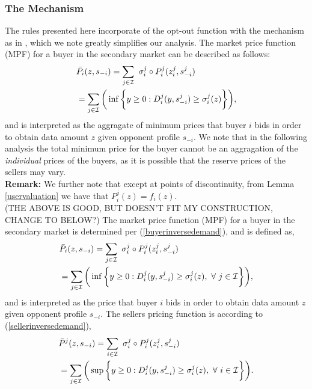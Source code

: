 \subsubsection{The Mechanism}\label{datamechanism}
The rules presented here incorporate of the opt-out function with the
mechanism as in \cite{lazar}, which we note greatly simplifies our
analysis. 
The market price function (MPF) for a buyer in the secondary market
can be described as follows:
\begin{align}\label{dataprice}
\begin{split}
    &\bar{P}_i(z, s_{-i}) =\displaystyle\sum_{j\in\mathcal{I}} \ \sigma_i^j \circ P_i^j(z_i^j,
s_{-i}^j) \\
    &= \sum_{j\in\mathcal{I}}\bigg(\inf\bigg\lbrace y\ge 0 : 
    {D_i^j}(y,s_{-i}^j) \ge \sigma_i^j(z) \bigg\rbrace \bigg),\\
\end{split}
\end{align}
and is interpreted as the aggragate of minimum prices that buyer $i$ bids in
order to obtain
data amount $z$ given opponent profile $s_{-i}$. We note that in the following
analysis
the total minimum price for the buyer cannot be an aggragation of the
\emph{individual} prices of the buyers, as it is possible that the reserve prices
of the sellers may vary.\\
\textbf{Remark:} We further note that except at points of discontinuity, from
Lemma \ref{uservaluation} we have that $P_i^j(z) = f_i(z)$. \\
\iffalse
(THE ABOVE IS GOOD, BUT DOESN'T FIT MY CONSTRUCTION, CHANGE TO BELOW?)
The market price function (MPF) for a buyer in the secondary market
is determined per (\ref{buyerinversedemand}), and is defined as,
\begin{align}\label{dataprice}
\begin{split}
    &\bar{P}_i(z, s_{-i}) =\displaystyle\sum_{j\in\mathcal{I}} \ \sigma_i^j \circ P_i^j(z_i^j,
s_{-i}^j) \\
    &= \sum_{j\in\mathcal{I}}\bigg(\inf\bigg\lbrace y\ge 0 : 
    {D_i^j}(y,s_{-i}^j) \ge \sigma_i^j(z), \ \forall \ j\in\mathcal{I} \bigg\rbrace \bigg),\\
\end{split}
\end{align}
and is interpreted as the price that buyer $i$ bids in
order to obtain
data amount $z$ given opponent profile $s_{-i}$.
The sellers pricing function is according to (\ref{sellerinversedemand}), 
\begin{align}\label{dataprice}
\begin{split}
    &\bar{P}^j(z, s_{-i}) =\displaystyle\sum_{i\in\mathcal{I}} \ \sigma_i^j \circ P_i^j(z_i^j,
s_{-i}^j) \\
    &= \sum_{j\in\mathcal{I}}\bigg(\sup\bigg\lbrace y\ge 0 : 
    {D_i^j}(y,s_{-i}^j) \ge \sigma_i^j(z), \ \forall \ i\in\mathcal{I} \bigg\rbrace \bigg).\\
\end{split}
\end{align}

